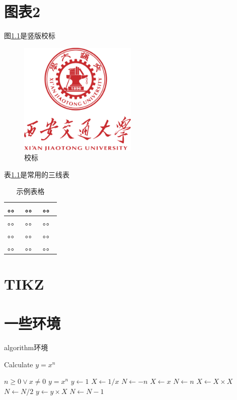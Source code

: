 \documentclass[bachelor]{XJTUthesis}
\begin{document}
\chapter{图表2}
图\ref{xioabioa:shu}是竖版校标
\begin{figure}[htbp]
  \centering
  \includegraphics[width=0.5\textwidth]{figures//a4_7sbzh.png}
  \caption{校标}\label{xioabioa:shu}
\end{figure}

表\ref{tab:test}是常用的三线表
\begin{table}[htbp]
    \centering
    \begin{tabular}{lcl}
        \toprule
        。。 & 。。 & 。。 \\
        \midrule
        。。 & 。。 & 。。 \\
        。。 & 。。 & 。。 \\
        。。 & 。。 & 。。 \\
        \bottomrule
    \end{tabular}
    \caption{\label{tab:test}示例表格}
\end{table}

\chapter{TIKZ}

\chapter{一些环境}
algorithm环境
\begin{algorithm}
    \caption{Calculate $y = x^n$}
    \label{alg1}
    \begin{algorithmic}
        \REQUIRE $n \geq 0 \vee x \neq 0$
        \ENSURE $y = x^n$
        \STATE $y \leftarrow 1$
        \STATE $X \leftarrow 1 / x$
        \STATE $N \leftarrow -n$
        \ELSE
        \STATE $X \leftarrow x$
        \STATE $N \leftarrow n$
        \ENDIF
        \STATE $X \leftarrow X \times X$
        \STATE $N \leftarrow N / 2$
        \ELSE[$N$ is odd]
        \STATE $y \leftarrow y \times X$
        \STATE $N \leftarrow N - 1$
        \ENDIF
        \ENDWHILE
    \end{algorithmic}
\end{algorithm}
\end{document}
